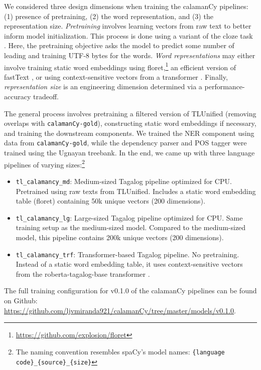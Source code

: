 \documentclass[11pt]{article}
\begin{document}
We considered three design dimensions when training the calamanCy pipelines: (1) presence of pretraining, (2) the word representation, and (3) the representation size.
\textit{Pretraining} involves learning vectors from raw text to better inform model initialization.
This process is done using a variant of the cloze task \citep{Devlin2019BERTPO}.
Here, the pretraining objective asks the model to predict some number of leading and training UTF-8 bytes for the words.
\textit{Word representations} may either involve training static word embeddings using floret,\footnote[3]{\url{https://github.com/explosion/floret}} an efficient version of fastText \citep{Bojanowski2016EnrichingWV}, or using context-sensitive vectors from a transformer \citep{Vaswani2017AttentionIA}.
Finally, \textit{representation size} is an engineering dimension determined via a performance-accuracy tradeoff.

The general process involves pretraining a filtered version of TLUnified (removing overlaps with \texttt{calamanCy-gold}), constructing static word embeddings if necessary, and training the downstream components.
We trained the NER component using data from \texttt{calamanCy-gold}, while the dependency parser and POS tagger were trained using the Ugnayan treebank.
In the end, we came up with three language pipelines of varying sizes:\footnote[4]{The naming convention resembles spaCy's model names: \texttt{\{language code\}\_\{source\}\_\{size\}}}

\begin{itemize}
  \item \texttt{tl\_calamancy\_md}: Medium-sized Tagalog pipeline optimized for CPU. Pretrained using raw texts from TLUnified. Includes a static word embedding table (floret) containing 50k unique vectors (200 dimensions).
  \item \texttt{tl\_calamancy\_lg}: Large-sized Tagalog pipeline optimized for CPU. Same training setup as the medium-sized model. Compared to the medium-sized model, this pipeline contains 200k unique vectors (200 dimensions).
  \item \texttt{tl\_calamancy\_trf}: Transformer-based Tagalog pipeline. No pretraining. Instead of a static word embedding table, it uses context-sensitive vectors from the roberta-tagalog-base transformer \citep{Cruz2021ImprovingLL}.
\end{itemize}

The full training configuration for v0.1.0 of the calamanCy pipelines can be found on Github: \url{https://github.com/ljvmiranda921/calamanCy/tree/master/models/v0.1.0}.
\end{document}
